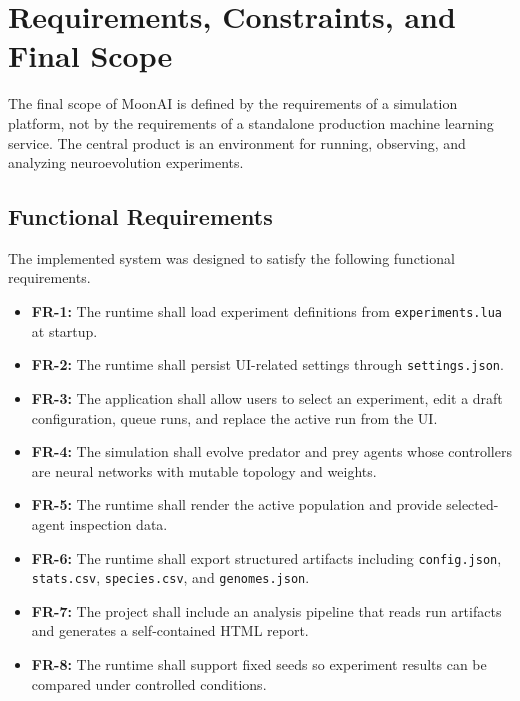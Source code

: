 \section{Requirements, Constraints, and Final Scope}
\label{sec:reqs}

The final scope of MoonAI is defined by the requirements of a simulation platform, not by the
requirements of a standalone production machine learning service. The central product is an
environment for running, observing, and analyzing neuroevolution experiments.

\subsection{Functional Requirements}

The implemented system was designed to satisfy the following functional requirements.

\begin{itemize}[nosep]
  \item \textbf{FR-1:} The runtime shall load experiment definitions from
    \texttt{experiments.lua} at startup.
  \item \textbf{FR-2:} The runtime shall persist UI-related settings through
    \texttt{settings.json}.
  \item \textbf{FR-3:} The application shall allow users to select an experiment, edit a draft
    configuration, queue runs, and replace the active run from the UI.
  \item \textbf{FR-4:} The simulation shall evolve predator and prey agents whose controllers
    are neural networks with mutable topology and weights.
  \item \textbf{FR-5:} The runtime shall render the active population and provide selected-agent
    inspection data.
  \item \textbf{FR-6:} The runtime shall export structured artifacts including
    \texttt{config.json}, \texttt{stats.csv}, \texttt{species.csv}, and
    \texttt{genomes.json}.
  \item \textbf{FR-7:} The project shall include an analysis pipeline that reads run artifacts and
    generates a self-contained HTML report.
  \item \textbf{FR-8:} The runtime shall support fixed seeds so experiment results can be
    compared under controlled conditions.
\end{itemize}

